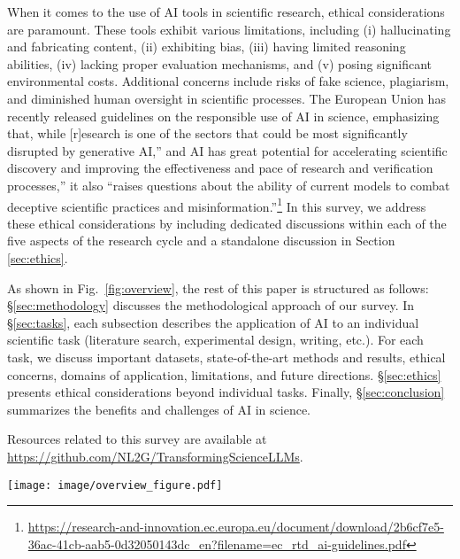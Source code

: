 When it comes to the use of AI tools in scientific research, ethical considerations are paramount. These tools exhibit various limitations, including (i) hallucinating and fabricating content, (ii) exhibiting bias, (iii) having limited reasoning abilities, (iv) lacking proper evaluation mechanisms, and (v) posing significant environmental costs. Additional concerns include risks of fake science, plagiarism, and diminished human oversight in scientific processes. The European Union has recently released guidelines on the responsible use of AI in science, emphasizing that, while [r]esearch is one of the sectors that could be most significantly disrupted by generative AI,'' and AI has great potential for accelerating scientific discovery and improving the effectiveness and pace of research and verification processes,'' it also ``raises questions about the ability of current models to combat deceptive scientific practices and misinformation.''\footnote{\url{https://research-and-innovation.ec.europa.eu/document/download/2b6cf7e5-36ac-41cb-aab5-0d32050143dc_en?filename=ec_rtd_ai-guidelines.pdf}} In this survey, we address these ethical considerations by including dedicated discussions within each of the five aspects of the research cycle and a standalone discussion in Section \ref{sec:ethics}.


As shown in Fig.~\ref{fig:overview}, the rest of this paper is structured as follows: \S\ref{sec:methodology} discusses the methodological approach of our survey. In \S\ref{sec:tasks}, each subsection describes the application of AI to an individual scientific task (literature search, experimental design, writing, etc.). For each task, we discuss important datasets, state-of-the-art methods and results, ethical concerns, domains of application, limitations, and future directions. \S\ref{sec:ethics} presents ethical considerations beyond individual tasks. Finally, \S\ref{sec:conclusion} summarizes the benefits and challenges of AI in science. %

Resources related to this survey are available at \url{https://github.com/NL2G/TransformingScienceLLMs}. 

\begin{figure*}[htbp]
  \centering
  \texttt{[image: image/overview\_figure.pdf]}
  \caption{Overview of the survey structure, including our survey methodology, five AI-assisted topics or tasks, and ethical considerations.} 
  \label{fig:overview}
\end{figure*}